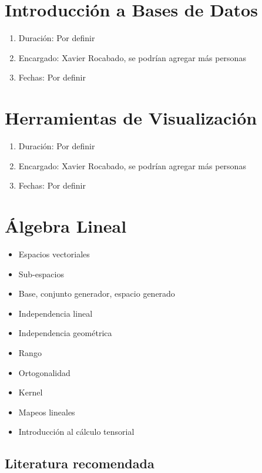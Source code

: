 \documentclass{article}
\begin{document}
    \section{Introducción a Bases de Datos}

        \begin{enumerate}
            \item Duración: Por definir
            \item Encargado: Xavier Rocabado, se podrían agregar más personas
            \item Fechas: Por definir
        \end{enumerate}

    \section{Herramientas de Visualización}

        \begin{enumerate}
            \item Duración: Por definir
            \item Encargado: Xavier Rocabado, se podrían agregar más personas
            \item Fechas: Por definir
        \end{enumerate}

    \section{Álgebra Lineal}

        \begin{itemize}
            \item Espacios vectoriales
            \item Sub-espacios
            \item Base, conjunto generador, espacio generado
            \item Independencia lineal
            \item Independencia geométrica
            \item Rango
            \item Ortogonalidad
            \item Kernel
            \item Mapeos lineales
            \item Introducción al cálculo tensorial
        \end{itemize}

        \subsection{Literatura recomendada}
\end{document}
